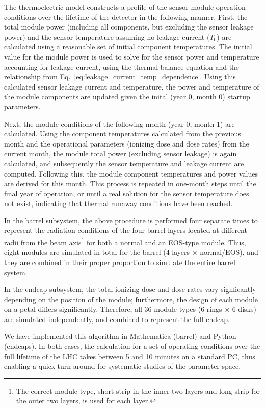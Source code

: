 \label{sec:running}
The thermoelectric model constructs a profile of the sensor module operation conditions over the
lifetime of the detector in the following manner. First, the total module power (including all components, but excluding the sensor
leakage power) and the sensor temperature assuming no leakage current ($T_0$) are calculated 
using a reasonable set of initial component temperatures.
The initial value for the module power is used to solve for the sensor power and temperature accounting
for leakage current, using the thermal balance equation and the relationship from
Eq.~\ref{eq:leakage_current_temp_dependence}.
Using this calculated sensor leakage current and temperature, the power and temperature of the module
components are updated given the inital (year 0, month 0) startup parameters.

Next, the module conditions of the following month (year 0, month 1) are calculated. Using the component
temperatures calculated from the previous month and the operational parameters (ionizing dose and dose
rates) from the current month, the module total power (excluding sensor leakage) is again calculated, and
subsequently the sensor temperature and leakage current are computed. Following this,
the module component temperatures and power values are derived for this month. This process is repeated in one-month
steps until the final year of operation, or until a real solution for the sensor temperature does not
exist, indicating that thermal runaway conditions have been reached.

In the barrel subsystem, the above procedure is performed four separate times to
represent the radiation conditions of the four barrel layers located at different radii from the beam axis\footnote{The correct module type, short-strip in the inner two layers and long-strip for the outer two layers, is used for each layer.} for both a normal and an EOS-type module. Thus, eight modules are simulated in total for the barrel (4 layers $\times$ normal/EOS), and they are combined in their proper proportion to simulate the entire barrel system.

In the endcap subsystem, the total ionizing dose and dose rates vary signficantly depending on the
position of the module; furthermore, the design of each module on a petal differs significantly.
Therefore, all 36 module types (6 rings $\times$ 6 disks) are simulated independently, and combined to
represent the full endcap.

We have implemented this algorithm in Mathematica (barrel) and Python (endcaps). In both cases, the calculation for a set of operating conditions over the full lifetime of the LHC takes between 5 and 10 minutes on a standard PC, thus enabling a quick turn-around for systematic studies of the parameter space.

